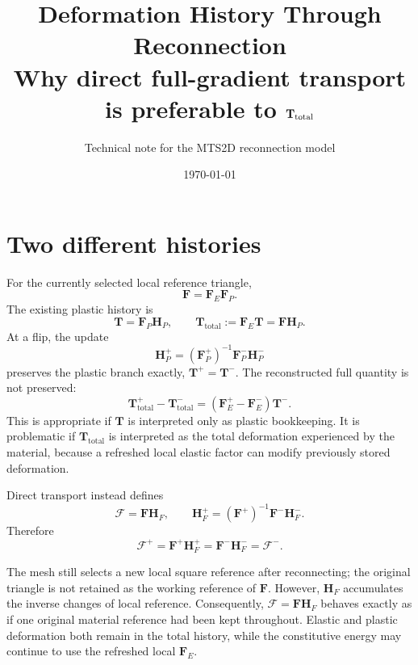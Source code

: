 \documentclass[10pt,a4paper]{article}
\title{\vspace{-1.2em}\textbf{Deformation History Through Reconnection}\\
\large Why direct full-gradient transport is preferable to $\Ttotal$}
\author{Technical note for the MTS2D reconnection model}
\date{\today}
\newcommand{\Fm}{\boldsymbol{\mathcal F}}
\newcommand{\F}{\mathbf F}
\newcommand{\FE}{\mathbf F_{\!E}}
\newcommand{\FP}{\mathbf F_{\!P}}
\newcommand{\HP}{\mathbf H_{\!P}}
\newcommand{\HF}{\mathbf H_{\!F}}
\newcommand{\T}{\mathbf T}
\newcommand{\Ttotal}{\mathbf T_{\mathrm{total}}}
\newcommand{\old}{^{-}}
\newcommand{\new}{^{+}}
\begin{document}
\maketitle
\vspace{-1.2em}

\section{Two different histories}

For the currently selected local reference triangle,
\begin{equation}
  \F=\FE\FP .
\end{equation}
The existing plastic history is
\begin{equation}
  \T=\FP\HP,
  \qquad
  \Ttotal:=\FE\T=\F\HP .
\end{equation}
At a flip, the update
\begin{equation}
  \HP\new=(\FP\new)^{-1}\FP\old\HP\old
\end{equation}
preserves the plastic branch exactly, $\T\new=\T\old$.  The reconstructed full
quantity is not preserved:
\begin{equation}
  \boxed{
  \Ttotal\new-\Ttotal\old
  =(\FE\new-\FE\old)\T\old .}
  \label{eq:t-total-change}
\end{equation}
This is appropriate if $\T$ is interpreted only as plastic bookkeeping.  It is
problematic if $\Ttotal$ is interpreted as the total deformation experienced
by the material, because a refreshed local elastic factor can modify previously
stored deformation.

Direct transport instead defines
\begin{equation}
  \Fm=\F\HF,
  \qquad
  \HF\new=(\F\new)^{-1}\F\old\HF\old .
  \label{eq:full-update}
\end{equation}
Therefore
\begin{equation}
  \boxed{\Fm\new=\F\new\HF\new
  =\F\old\HF\old=\Fm\old .}
\end{equation}

The mesh still selects a new local square reference after reconnecting; the
original triangle is not retained as the working reference of $\F$.  However,
$\HF$ accumulates the inverse changes of local reference.  Consequently,
$\Fm=\F\HF$ behaves exactly as if one original material reference had been kept
throughout.  Elastic and plastic deformation both remain in the total history,
while the constitutive energy may continue to use the refreshed local $\FE$.
\end{document}
